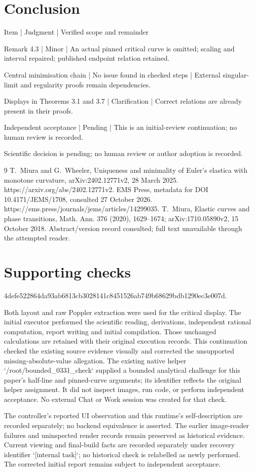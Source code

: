 \documentclass[10pt]{article}
\begin{document}
\section*{Conclusion}
Item | Judgment | Verified scope and remainder\par
Remark 4.3 | Minor | An actual pinned critical curve is omitted; scaling and interval repaired; published endpoint relation retained.\par
Central minimisation chain | No issue found in checked steps | External singular-limit and regularity proofs remain dependencies.\par
Displays in Theorems 3.1 and 3.7 | Clarification | Correct relations are already present in their proofs.\par
Independent acceptance | Pending | This is an initial-review continuation; no human review is recorded.\par
Scientific decision is pending; no human review or author adoption is recorded.\par
9 T. Miura and G. Wheeler, Uniqueness and minimality of Euler’s elastica with monotone curvature, arXiv:2402.12771v2, 28 March 2025. https://arxiv.org/abs/2402.12771v2. EMS Press, metadata for DOI 10.4171/JEMS/1708, consulted 27 October 2026. https://ems.press/journals/jems/articles/14299035. T. Miura, Elastic curves and phase transitions, Math. Ann. 376 (2020), 1629–1674; arXiv:1710.05890v2, 15 October 2018. Abstract/version record consulted; full text unavailable through the attempted reader.\par
\section*{Supporting checks}
4defe522864da93ab6813cb3028141c8451526ab749b68629bdb1290ec3e007d.\par
Both layout and raw Poppler extraction were used for the critical display. The initial executor performed the scientific reading, derivations, independent rational computation, report writing and initial compilation. Those unchanged calculations are retained with their original execution records. This continuation checked the existing source evidence visually and corrected the unsupported missing-absolute-value allegation. The existing native helper `/root/bounded\_0331\_check` supplied a bounded analytical challenge for this paper’s half-line and pinned-curve arguments; its identifier reflects the original helper assignment. It did not inspect images, run code, or perform independent acceptance. No external Chat or Work session was created for that check.\par
The controller’s reported UI observation and this runtime’s self-description are recorded separately; no backend equivalence is asserted. The earlier image-reader failures and uninspected render records remain preserved as historical evidence. Current viewing and final-build facts are recorded separately under recovery identifier `[internal task]`; no historical check is relabelled as newly performed. The corrected initial report remains subject to independent acceptance.\par
\end{document}
